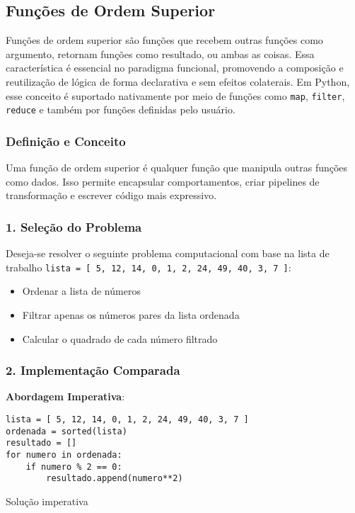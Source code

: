 \documentclass{article}
\begin{document}
\subsection{Funções de Ordem Superior}
Funções de ordem superior são funções que recebem outras funções como argumento, retornam funções como resultado, ou ambas as coisas. Essa característica é essencial no paradigma funcional, promovendo a composição e reutilização de lógica de forma declarativa e sem efeitos colaterais. Em Python, esse conceito é suportado nativamente por meio de funções como \texttt{map}, \texttt{filter}, \texttt{reduce} e também por funções definidas pelo usuário.

\subsubsection{Definição e Conceito}
Uma função de ordem superior é qualquer função que manipula outras funções como dados. Isso permite encapsular comportamentos, criar pipelines de transformação e escrever código mais expressivo.

\subsubsection*{1. Seleção do Problema}

Deseja-se resolver o seguinte problema computacional com base na lista de trabalho \texttt{lista = [ 5, 12, 14, 0, 1, 2, 24, 49, 40, 3, 7 ]}:
\begin{itemize}
    \item Ordenar a lista de números
    \item Filtrar apenas os números pares da lista ordenada
    \item Calcular o quadrado de cada número filtrado
\end{itemize}

\subsubsection*{2. Implementação Comparada}

\textbf{Abordagem Imperativa}:

\begin{listing}[!ht]
\begin{verbatim}
lista = [ 5, 12, 14, 0, 1, 2, 24, 49, 40, 3, 7 ]
ordenada = sorted(lista)
resultado = []
for numero in ordenada:
    if numero % 2 == 0:
        resultado.append(numero**2)
\end{verbatim}
\caption{Solução imperativa}
\label{listing:hof_imperativa}
\end{listing}
\end{document}
